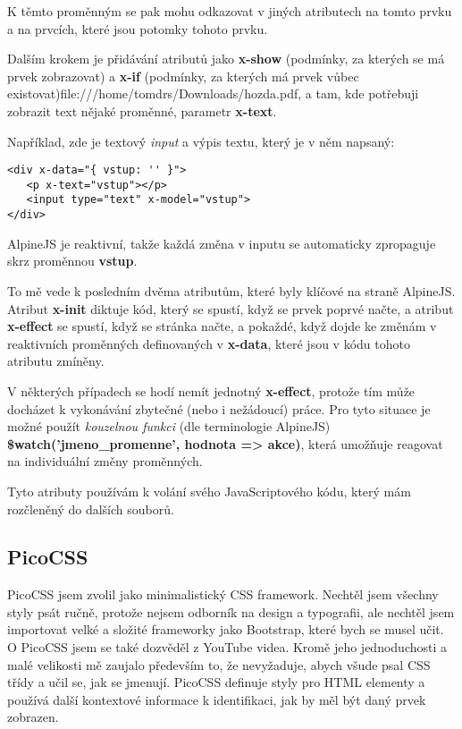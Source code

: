 \documentclass[11pt,a4paper,twoside,openright]{report}
\begin{document}
K těmto proměnným se pak mohu odkazovat v jiných atributech na tomto prvku a na prvcích, které jsou
potomky tohoto prvku.

Dalším krokem je přidávání atributů jako \textbf{x-show} (podmínky, za kterých se má prvek zobrazovat)
a \textbf{x-if} (podmínky, za kterých má prvek vůbec existovat)file:///home/tomdrs/Downloads/hozda.pdf, a tam, kde potřebuji zobrazit text
nějaké proměnné, parametr \textbf{x-text}.

Například, zde je textový \emph{input} a výpis textu, který je v něm napsaný:

\begin{verbatim}
<div x-data="{ vstup: '' }">
   <p x-text="vstup"></p>
   <input type="text" x-model="vstup">
</div>
\end{verbatim}

AlpineJS je reaktivní, takže každá změna v inputu se automaticky zpropaguje skrz proměnnou \textbf{vstup}.

To mě vede k posledním dvěma atributům, které byly klíčové na straně AlpineJS. Atribut \textbf{x-init}
diktuje kód, který se spustí, když se prvek poprvé načte, a atribut \textbf{x-effect} se spustí, když
se stránka načte, a pokaždé, když dojde ke změnám v reaktivních proměnných definovaných v \textbf{x-data},
které jsou v kódu tohoto atributu zmíněny.

V některých případech se hodí nemít jednotný \textbf{x-effect}, protože tím může docházet k vykonávání
zbytečné (nebo i nežádoucí) práce. Pro tyto situace je možné použít \emph{kouzelnou funkci} (dle terminologie
AlpineJS) \textbf{\$watch('jmeno\_promenne', hodnota => akce)}, která umožňuje reagovat na individuální
změny proměnných.

Tyto atributy používám k volání svého JavaScriptového kódu, který mám rozčleněný do dalších souborů.

\subsection{PicoCSS}

PicoCSS jsem zvolil jako minimalistický CSS framework. Nechtěl jsem všechny styly psát ručně, protože
nejsem odborník na design a typografii, ale nechtěl jsem importovat velké a složité frameworky jako
Bootstrap, které bych se musel učit. O PicoCSS jsem se také dozvěděl z YouTube videa. Kromě jeho jednoduchosti
a malé velikosti mě zaujalo především to, že nevyžaduje, abych všude psal CSS třídy a učil se, jak se
jmenují. PicoCSS definuje styly pro HTML elementy a používá další kontextové informace k identifikaci,
jak by měl být daný prvek zobrazen.
\end{document}
